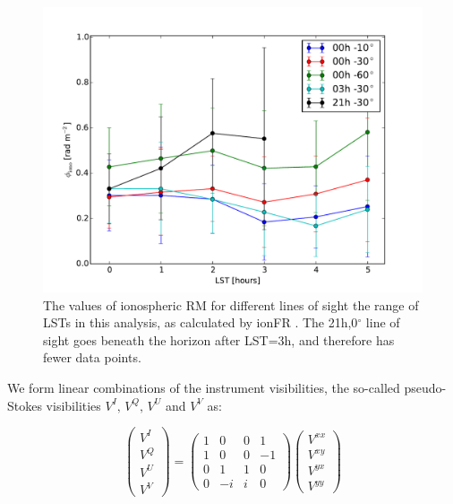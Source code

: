 \begin{figure}
\centering
\includegraphics[scale=0.45]{chapters/eor_window_PAPER/figures/ionosphere4casacal_morelines.pdf}
\caption[The values of ionospheric RM for different lines of sight a range of LSTs.]{The values of ionospheric RM for different lines of sight the range of LSTs in this analysis, as calculated by {\sc ionFR} \protect\citep{Sotomayor-Beltran.13}. The 21h,0$^{\circ}$ line of sight goes beneath the horizon after LST=3h, and therefore has fewer data points.\\ }%
\label{fig:psa32img_ionosphere}
\end{figure}


We form linear combinations of the instrument visibilities, the so-called pseudo-Stokes visibilities \citep[see e.g.][]{Moore.13} $V^I,\,V^Q,\,V^U$ and $V^V$ as:

\begin{equation}
\left(\begin{array}{c}
V^{I}\\
V^{Q}\\
V^{U}\\
V^{V}\end{array} \right)
=
\left( \begin{array}{cccc}
1 & 0 & 0 & 1 \\
1 & 0 & 0 & -1 \\
0 & 1 & 1 & 0 \\
0 & -i & i & 0 \end{array} \right) 
\left(\begin{array}{c}
V^{xx}\\
V^{xy}\\
V^{yx}\\
V^{yy}\end{array} \right) 
\label{eq:psa32_stokes}
\end{equation}

